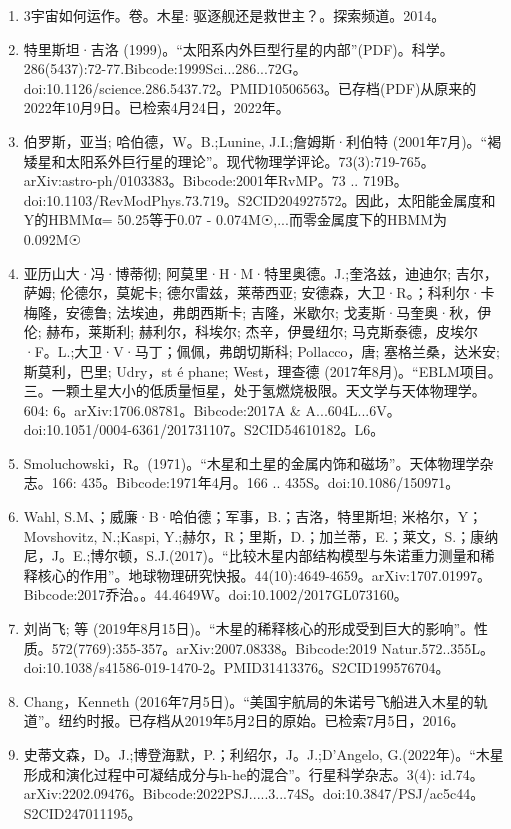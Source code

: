 \begin{enumerate}
\item 3宇宙如何运作。卷。木星: 驱逐舰还是救世主？。探索频道。2014。
\item 特里斯坦·吉洛 (1999)。“太阳系内外巨型行星的内部”(PDF)。科学。286(5437):72-77.Bibcode:1999Sci...286...72G。doi:10.1126/science.286.5437.72。PMID10506563。已存档(PDF)从原来的2022年10月9日。已检索4月24日，2022年。  
\item 伯罗斯，亚当; 哈伯德，W。B.;Lunine, J.I.;詹姆斯·利伯特 (2001年7月)。“褐矮星和太阳系外巨行星的理论”。现代物理学评论。73(3):719-765。arXiv:astro-ph/0103383。Bibcode:2001年RvMP。73 .. 719B。doi:10.1103/RevModPhys.73.719。S2CID204927572。因此，太阳能金属度和Y的HBMMα= 50.25等于0.07 - 0.074M☉,...而零金属度下的HBMM为0.092M☉ 
\item 亚历山大·冯·博蒂彻; 阿莫里·H·M·特里奥德。J.;奎洛兹，迪迪尔; 吉尔，萨姆; 伦德尔，莫妮卡; 德尔雷兹，莱蒂西亚; 安德森，大卫·R。；科利尔·卡梅隆，安德鲁; 法埃迪，弗朗西斯卡; 吉隆，米歇尔; 戈麦斯·马奎奥·秋，伊伦; 赫布，莱斯利; 赫利尔，科埃尔; 杰辛，伊曼纽尔; 马克斯泰德，皮埃尔·F。L.;大卫·V·马丁；佩佩，弗朗切斯科; Pollacco，唐; 塞格兰桑，达米安; 斯莫利，巴里; Udry，st é phane; West，理查德 (2017年8月)。“EBLM项目。三。一颗土星大小的低质量恒星，处于氢燃烧极限。天文学与天体物理学。604: 6。arXiv:1706.08781。Bibcode:2017A & A...604L...6V。doi:10.1051/0004-6361/201731107。S2CID54610182。L6。 
\item Smoluchowski，R。(1971)。“木星和土星的金属内饰和磁场”。天体物理学杂志。166: 435。Bibcode:1971年4月。166 .. 435S。doi:10.1086/150971。
\item Wahl, S.M、；威廉·B·哈伯德；军事，B.；吉洛，特里斯坦; 米格尔，Y；Movshovitz, N.;Kaspi, Y.;赫尔，R；里斯，D.；加兰蒂，E.；莱文，S.；康纳尼，J。E.;博尔顿，S.J.(2017)。“比较木星内部结构模型与朱诺重力测量和稀释核心的作用”。地球物理研究快报。44(10):4649-4659。arXiv:1707.01997。Bibcode:2017乔治。。44.4649W。doi:10.1002/2017GL073160。
\item 刘尚飞; 等 (2019年8月15日)。“木星的稀释核心的形成受到巨大的影响”。性质。572(7769):355-357。arXiv:2007.08338。Bibcode:2019 Natur.572..355L。doi:10.1038/s41586-019-1470-2。PMID31413376。S2CID199576704。  
\item Chang，Kenneth (2016年7月5日)。“美国宇航局的朱诺号飞船进入木星的轨道”。纽约时报。已存档从2019年5月2日的原始。已检索7月5日，2016。
\item 史蒂文森，D。J.;博登海默，P.；利绍尔，J。J.;D'Angelo, G.(2022年)。“木星形成和演化过程中可凝结成分与h-he的混合”。行星科学杂志。3(4): id.74。arXiv:2202.09476。Bibcode:2022PSJ.....3...74S。doi:10.3847/PSJ/ac5c44。S2CID247011195。 

\end{enumerate}
